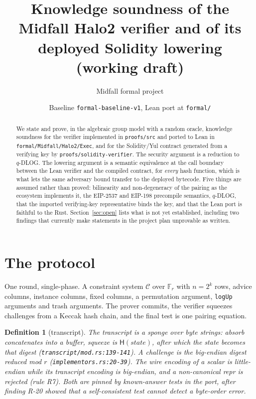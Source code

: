 \documentclass[11pt]{article}
\title{Knowledge soundness of the Midfall Halo2 verifier and of its deployed
Solidity lowering \\ \large (working draft)}
\author{Midfall formal project}
\date{Baseline \texttt{formal-baseline-v1}, Lean port at \texttt{formal/}}
\newtheorem{definition}[theorem]{Definition}
\newcommand{\Fr}{\mathbb{F}_r}
\newcommand{\Hash}{\mathsf{H}}
\begin{document}
\maketitle

\begin{abstract}
We state and prove, in the algebraic group model with a random oracle, knowledge
soundness for the verifier implemented in \texttt{proofs/src} and ported to Lean in
\texttt{formal/Midfall/Halo2/Exec}, and for the Solidity/Yul contract generated from
a verifying key by \texttt{proofs/solidity-verifier}. The security argument is a
reduction to $q$-DLOG. The lowering argument is a semantic equivalence at the call
boundary between the Lean verifier and the compiled contract, for \emph{every} hash
function, which is what lets the same adversary bound transfer to the deployed
bytecode. Five things are assumed rather than proved: bilinearity and non-degeneracy
of the pairing as the ecosystem implements it, the EIP-2537 and EIP-198 precompile
semantics, $q$-DLOG, that the imported verifying-key representative binds the key,
and that the Lean port is faithful to the Rust. Section~\ref{sec:open} lists what is
not yet established, including two findings that currently make statements in the
project plan unprovable as written.
\end{abstract}

\section{The protocol}

One round, single-phase. A constraint system $\mathcal{C}$ over $\Fr$ with $n=2^k$
rows, advice columns, instance columns, fixed columns, a permutation argument,
\texttt{logUp} arguments and trash arguments. The prover commits, the verifier
squeezes challenges from a Keccak hash chain, and the final test is one pairing
equation.

\begin{definition}[transcript]\label{def:transcript}
The transcript is a sponge over byte strings: absorb concatenates into a buffer,
squeeze is $\Hash(\mathit{state})$, after which the state \emph{becomes} that
digest (\texttt{transcript/mod.rs:139-141}). A challenge is the \emph{big-endian}
digest reduced mod $r$ (\texttt{implementors.rs:20-39}). The wire encoding of a
scalar is little-endian while its transcript encoding is big-endian, and a
non-canonical repr is rejected (rule R7). Both are pinned by known-answer tests in
the port, after finding R-20 showed that a self-consistent test cannot detect a
byte-order error.
\end{definition}
\end{document}
